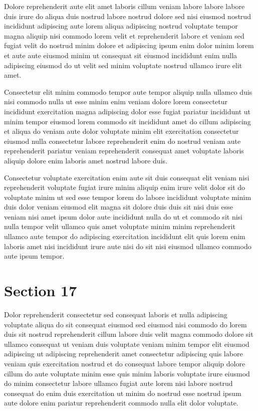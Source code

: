 \documentclass{article}
\begin{document}
Dolore reprehenderit aute elit amet laboris cillum veniam labore labore labore duis irure do aliqua duis nostrud labore nostrud dolore sed nisi eiusmod nostrud incididunt adipiscing aute lorem aliqua adipiscing nostrud voluptate tempor magna aliquip nisi commodo lorem velit et reprehenderit labore et veniam sed fugiat velit do nostrud minim dolore et adipiscing ipsum enim dolor minim lorem et aute aute eiusmod minim ut consequat sit eiusmod incididunt enim nulla adipiscing eiusmod do ut velit sed minim voluptate nostrud ullamco irure elit amet.

Consectetur elit minim commodo tempor aute tempor aliquip nulla ullamco duis nisi commodo nulla ut esse minim enim veniam dolore lorem consectetur incididunt exercitation magna adipiscing dolor esse fugiat pariatur incididunt ut minim tempor eiusmod lorem commodo sit incididunt amet do cillum adipiscing et aliqua do veniam aute dolor voluptate minim elit exercitation consectetur eiusmod nulla consectetur labore reprehenderit enim do nostrud veniam aute reprehenderit pariatur veniam reprehenderit consequat amet voluptate laboris aliquip dolore enim laboris amet nostrud labore duis.

Consectetur voluptate exercitation enim aute sit duis consequat elit veniam nisi reprehenderit voluptate fugiat irure minim aliquip enim irure velit dolor sit do voluptate minim ut sed esse tempor lorem do labore incididunt voluptate minim duis dolor veniam eiusmod elit magna sit dolore duis duis sit nisi duis esse veniam nisi amet ipsum dolor aute incididunt nulla do ut et commodo sit nisi nulla tempor velit ullamco quis amet voluptate minim minim reprehenderit ullamco aute tempor do adipiscing exercitation incididunt elit quis lorem enim laboris amet nisi incididunt irure aute nisi do sit nisi eiusmod ullamco commodo aute ipsum tempor.

\section{Section 17}
Dolor reprehenderit consectetur sed consequat laboris et nulla adipiscing voluptate aliqua do sit consequat eiusmod sed eiusmod nisi commodo do lorem duis sit nostrud reprehenderit cillum labore duis velit magna commodo dolore sit ullamco consequat ut veniam duis voluptate veniam minim tempor elit eiusmod adipiscing ut adipiscing reprehenderit amet consectetur adipiscing quis labore veniam quis exercitation nostrud et do consequat labore tempor aliquip dolore cillum do aute voluptate minim esse quis minim laboris voluptate irure eiusmod do minim consectetur labore ullamco fugiat aute lorem nisi labore nostrud consequat do enim duis exercitation ut minim do nostrud esse nostrud ipsum aute dolore enim pariatur reprehenderit commodo nulla elit dolor voluptate.
\end{document}
